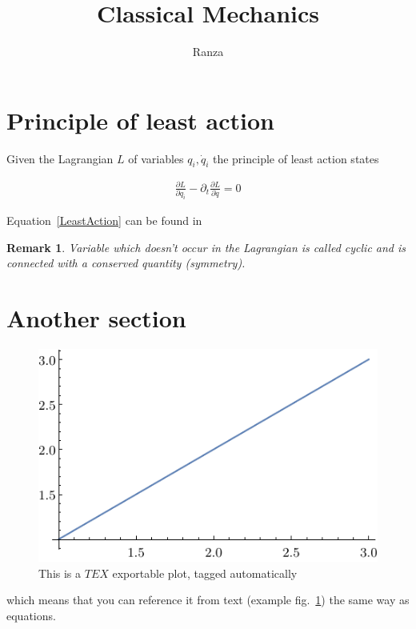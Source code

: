 \documentclass{article}
\title{Classical Mechanics}
\author[1]{Ranza}\affil[1]{ScienceNotebooks GitHub rep}
\let\Oldsection\section
\renewcommand{\section}{\FloatBarrier\Oldsection}
\newtheorem*{remark}{Remark}
\begin{document}
\maketitle

\section{Principle of least action}

Given the Lagrangian \(L\) of variables \(q_i,\dot{q}_i\) the principle of least action states

\begin{equation}\begin{aligned}\frac{\partial L}{\partial q_i}-\partial _t\frac{\partial L}{\partial \dot{q}}=0\end{aligned} \label{LeastAction}\end{equation}

Equation~\ref{LeastAction} can be found in~\cite{arnold1989mathematical}

\begin{remark}Variable which doesn’t occur in the Lagrangian is called cyclic and is connected with a conserved quantity (symmetry).\end{remark}

\section{Another section}

\begin{figure}[!htb]\centering\includegraphics[scale=0.7,max width=\textwidth]{plotName.pdf}\caption{ This is a \(TEX\) exportable plot, tagged automatically }\label{plotName}\end{figure} 

which means that you can reference it from text (example fig.~\ref{plotName}) the same way as equations.
\appto{\bibsetup}{\raggedright} %
\printbibliography
\end{document}

